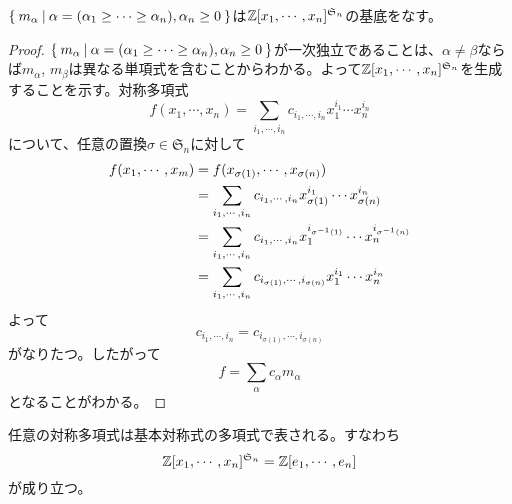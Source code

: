 \documentclass{ltjsreport}
\begin{document}
\begin{prop}\label{m_is_basis}
    $\left\{\:m_\alpha\:\middle|\:\alpha=(\alpha_1\geq\cdots\geq\alpha_n), \alpha_n\geq 0\:\right\}$は$\mathbb{Z}[x_1,\cdots,x_n]^{\mathfrak{S}_n}$の基底をなす。
\end{prop}

\begin{proof}
    $\left\{\:m_\alpha\:\middle|\:\alpha=(\alpha_1\geq\cdots\geq\alpha_n), \alpha_n\geq 0\:\right\}$が一次独立であることは、$\alpha\neq\beta$ならば$m_\alpha$, $m_\beta$は異なる単項式を含むことからわかる。よって$\mathbb{Z}[x_1,\cdots,x_n]^{\mathfrak{S}_n}$を生成することを示す。対称多項式
    \[
    f(x_1,\cdots,x_n)=\sum_{i_1,\cdots,i_n}c_{i_1,\cdots,i_n}x_1^{i_1}\cdots x_n^{i_n}
    \]
    について、任意の置換$\sigma\in\mathfrak{S}_n$に対して
    \begin{align*}
        f(x_1,\cdots,x_m)&=f(x_{\sigma(1)},\cdots,x_{\sigma(n)})\\
        &=\sum_{i_1,\cdots,i_n}c_{i_1,\cdots,i_n}x_{\sigma(1)}^{i_1}\cdots x_{\sigma(n)}^{i_n}\\
        &=\sum_{i_1,\cdots,i_n}c_{i_1,\cdots,i_n}x_1^{i_{\sigma^{-1}(1)}}\cdots x_n^{i_{\sigma^{-1}(n)}}\\
        &=\sum_{i_1,\cdots,i_n}c_{i_{\sigma(1)},\cdots,i_{\sigma(n)}}x_1^{i_1}\cdots x_n^{i_n}
    \end{align*}
    よって
    \[
        c_{i_1,\cdots,i_n}=c_{i_{\sigma(1)},\cdots,i_{\sigma(n)}}
    \]
    がなりたつ。したがって
    \[
    f=\sum_{\alpha}c_\alpha m_\alpha   
    \]
    となることがわかる。
\end{proof}

\begin{theo}[対称式の基本定理]\label{FT_of_sym}
    任意の対称多項式は基本対称式の多項式で表される。すなわち
    \[
    \mathbb{Z}[x_1,\cdots,x_n]^{\mathfrak{S}_n}=\mathbb{Z}[e_1,\cdots, e_n]
    \]
    が成り立つ。
\end{theo}
\end{document}
